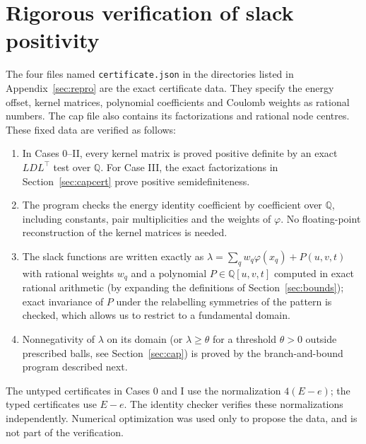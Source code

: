 \documentclass[11pt]{article}
\theoremstyle{definition}
\newcommand{\Q}{\mathbb{Q}}
\begin{document}
\section{Rigorous verification of slack positivity}\label{sec:verif}
The four files named \texttt{certificate.json} in the directories listed in Appendix~\ref{sec:repro}
are the exact certificate data. They specify the energy offset, kernel matrices, polynomial coefficients and
Coulomb weights as rational numbers. The cap file also contains its factorizations and rational node centres.
These fixed data are verified as follows:
\begin{enumerate}[label=(\alph*)]
\item In Cases 0--II, every kernel matrix is proved positive definite by an exact $LDL^\top$
test over $\Q$. For Case III, the exact factorizations in Section~\ref{sec:capcert} prove positive semidefiniteness.
\item The program  checks the energy identity coefficient by coefficient over $\Q$,
including constants, pair multiplicities and the weights of $\varphi$. No floating-point reconstruction
of the kernel matrices is needed.
\item The slack functions are written exactly as $\lambda=\sum_q w_q\varphi(x_q)+P(u,v,t)$ with rational weights $w_q$ and a
polynomial $P\in\Q[u,v,t]$ computed in exact rational arithmetic (by expanding the definitions of
Section~\ref{sec:bounds}); exact invariance of $P$ under the relabelling symmetries of the pattern is checked, which allows
us to restrict to a fundamental domain.
\item Nonnegativity of $\lambda$ on its domain (or $\lambda\ge\theta$ for a threshold $\theta>0$ outside prescribed balls,
see Section~\ref{sec:cap}) is proved by the branch-and-bound program  described next.
\end{enumerate}
The untyped certificates in Cases 0 and I use the normalization $4(E-e)$; the typed certificates use $E-e$.
The identity checker verifies these normalizations independently. Numerical optimization was used only to propose
the data, and is not part of the verification.
\end{document}
